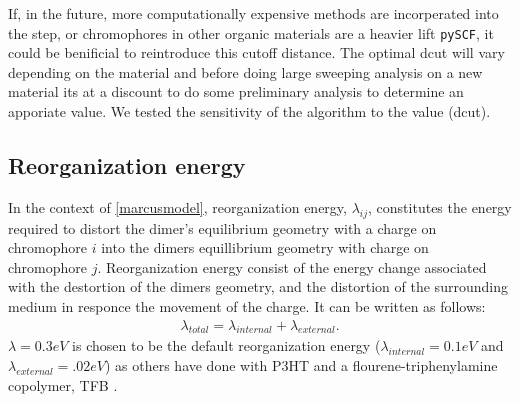 If, in the future, more computationally expensive methods are incorperated into the  step, or chromophores in other
organic materials are a heavier lift \texttt{pySCF}, it could be benificial to reintroduce this cutoff distance. The optimal dcut will vary depending on the material and before doing large sweeping analysis on a new
material its at a discount to do some preliminary analysis to determine an apporiate value. We tested the
sensitivity of the algorithm to the value (dcut). 

\subsection{Reorganization energy}

In the context of \autoref{marcusmodel}, 
reorganization energy, $\lambda_{ij}$, constitutes the energy required to distort the dimer's equilibrium geometry with a
charge on chromophore $i$ into the dimers equillibrium geometry with charge on chromophore $j$.
Reorganization energy consist of the energy change associated with the destortion of the dimers geometry,
and the distortion of the surrounding medium in responce the movement of the charge. It can be written as
follows:
\begin{align}
    \lambda_{total} = \lambda_{internal} + \lambda_{external}.
\end{align} 
$\lambda = 0.3eV$ is chosen to be the default reorganization energy ($\lambda_{internal} = 0.1eV$
and $\lambda_{external} = .02eV$) as others have done with P3HT \cite{jones2017} and
a flourene-triphenylamine copolymer, TFB \cite{Gali2017}. 

